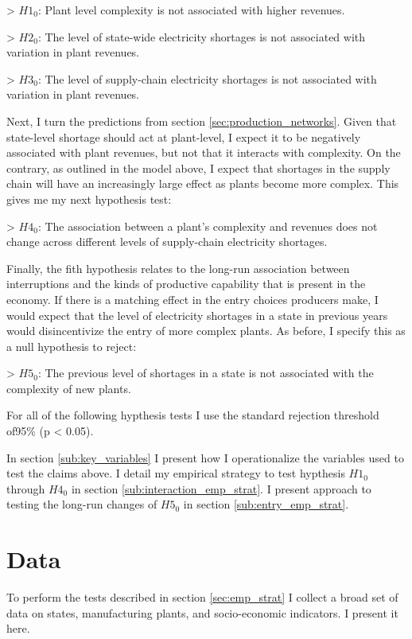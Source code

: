 \documentclass[11pt]{article}
\begin{document}
> $H1_0$: Plant level complexity is not associated with higher revenues.

> $H2_0$: The level of state-wide electricity shortages is not associated with variation in plant revenues.

> $H3_0$: The level of supply-chain electricity shortages is not associated with variation in plant revenues.

Next, I turn the predictions from section \ref{sec:production_networks}. Given that state-level shortage should act at plant-level, I expect it to be negatively associated with plant revenues, but not that it interacts with complexity. On the contrary, as outlined in the model above, I expect that shortages in the supply chain will have an increasingly large effect as plants become more complex. This gives me my next hypothesis test:

> $H4_0$: The association between a plant's complexity and revenues does not change across different levels of supply-chain electricity shortages.

Finally, the fith hypothesis relates to the long-run association between interruptions and the kinds of productive capability that is present in the economy. If there is a matching effect in the entry choices producers make, I would expect that the level of electricity shortages in a state in previous years would disincentivize the entry of more complex plants. As before, I specify this as a null hypothesis to reject:

> $H5_{0}$: The previous level of shortages in a state is not associated with the complexity of new plants.

For all of the following hypthesis tests I use the standard rejection threshold of95\% (p < 0.05).

In section \ref{sub:key_variables} I present how I operationalize the variables used to test the claims above. I detail my empirical strategy to test hypthesis $H1_0$ through $H4_0$ in section \ref{sub:interaction_emp_strat}. I present approach to testing the  long-run changes of $H5_0$ in section \ref{sub:entry_emp_strat}.

 \newpage

\section{Data}%
\label{sub:data}

To perform the tests described in section \ref{sec:emp_strat} I collect a broad set of data on states, manufacturing plants, and socio-economic indicators. I present it here.
\end{document}

